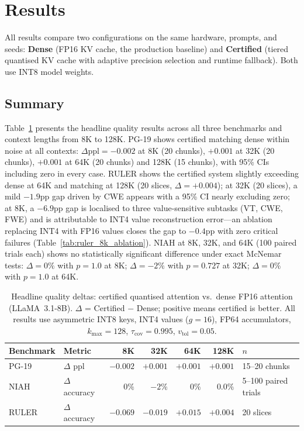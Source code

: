 \documentclass[11pt,a4paper]{article}
\theoremstyle{definition}
\theoremstyle{remark}
\begin{document}
\section{Results}
\label{sec:results}

All results compare two configurations on the same hardware, prompts, and seeds: \textbf{Dense} (FP16 KV cache, the production baseline) and \textbf{Certified} (tiered quantised KV cache with adaptive precision selection and runtime fallback).  Both use INT8 model weights.

\subsection{Summary}

Table~\ref{tab:summary} presents the headline quality results across all three benchmarks and context lengths from 8K to 128K.  PG-19 shows certified matching dense within noise at all contexts: $\Delta\mathrm{ppl}{=}{-}0.002$ at 8K (20 chunks), $+0.001$ at 32K (20 chunks), $+0.001$ at 64K (20 chunks) and 128K (15 chunks), with 95\% CIs including zero in every case.  RULER shows the certified system slightly exceeding dense at 64K and matching at 128K (20 slices, $\Delta{=}{+}0.004$); at 32K (20 slices), a mild $-1.9$pp gap driven by CWE appears with a 95\% CI nearly excluding zero; at 8K, a $-6.9$pp gap is localised to three value-sensitive subtasks (VT, CWE, FWE) and is attributable to INT4 value reconstruction error---an ablation replacing INT4 with FP16 values closes the gap to $-0.4$pp with zero critical failures (Table~\ref{tab:ruler_8k_ablation}).  NIAH at 8K, 32K, and 64K (100 paired trials each) shows no statistically significant difference under exact McNemar tests: $\Delta{=}0\%$ with $p{=}1.0$ at 8K; $\Delta{=}{-}2\%$ with $p{=}0.727$ at 32K; $\Delta{=}0\%$ with $p{=}1.0$ at 64K.

\begin{table}[H]
\centering
\caption{Headline quality deltas: certified quantised attention vs.\ dense FP16 attention (LLaMA~3.1-8B).  $\Delta$ = Certified $-$ Dense; positive means certified is better.  All results use asymmetric INT8 keys, INT4 values ($g{=}16$), FP64 accumulators, $k_{\max}{=}128$, $\tau_{\mathrm{cov}}{=}0.995$, $v_{\mathrm{tol}}{=}0.05$.}
\label{tab:summary}
\small
\begin{tabular}{llrrrrl}
\toprule
\textbf{Benchmark} & \textbf{Metric} & \textbf{8K} & \textbf{32K} & \textbf{64K} & \textbf{128K} & \textbf{$n$} \\
\midrule
PG-19 & $\Delta$ ppl & $-0.002$ & $+0.001$ & $+0.001$ & $+0.001$ & 15--20 chunks \\
NIAH & $\Delta$ accuracy & $0\%$ & $-2\%$ & $0\%$ & $0.0\%$ & 5--100 paired trials \\
RULER & $\Delta$ accuracy & $-0.069$ & $-0.019$ & $+0.015$ & $+0.004$ & 20 slices \\
\bottomrule
\end{tabular}
\\[2pt]
\end{table}
\end{document}
